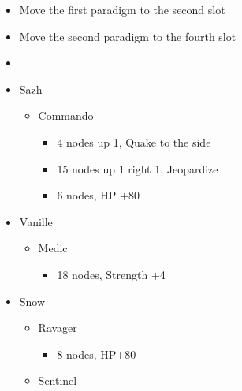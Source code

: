 \begin{menu}
		\begin{itemize}
			\paradigm
			\begin{itemize}
				\item Move the first paradigm to the second slot
				\item Move the second paradigm to the fourth slot
				\item {}%
				      {\paradigmline{(\syn)}{\sab}{\rav}}%
				      {\paradigmline{\com}{\sab}{\com}}%
				      {\paradigmline{\syn}{\med}{\com}}%
				      {\paradigmline{\com}{\med}{\com}}%
				      {\paradigmline[5]{\textit{\syn}}{\textit{\sab}}{\textit{\com}}}%
				      {\paradigmline{\com}{\rav}{\com}}
			\end{itemize}
			\crystarium
			\begin{itemize}
				\item Sazh
				      \begin{itemize}
					      \item Commando
					            \begin{itemize}
						            \item 4 nodes up 1, Quake to the side
						            \item 15 nodes up 1 right 1, Jeopardize
						            \item 6 nodes, HP +80
					            \end{itemize}
				      \end{itemize}
				\item Vanille
				      \begin{itemize}
					      \item Medic
					            \begin{itemize}
						            \item 18 nodes, Strength +4
					            \end{itemize}
				      \end{itemize}
				\item Snow
				      \begin{itemize}
					      \item Ravager
					            \begin{itemize}
						            \item 8 nodes, HP+80
					            \end{itemize}
					      \item Sentinel
					            \begin{itemize}

\end{itemize}
\end{itemize}
\end{itemize}
\end{itemize}
\end{menu}
